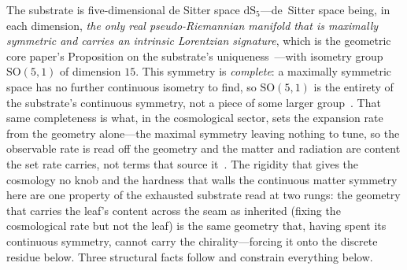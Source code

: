 \documentclass[11pt]{article}
\theoremstyle{plain}
\theoremstyle{remark}
\newcommand{\dS}{\mathrm{dS}}
\newcommand{\SO}{\mathrm{SO}}
\begin{document}
The substrate is five-dimensional de Sitter space $\dS_5$---de~Sitter space being, in each dimension, \emph{the only real pseudo-Riemannian manifold that is maximally symmetric and carries an intrinsic Lorentzian signature}, which is the geometric core paper's Proposition on the substrate's uniqueness~\cite{JanzenGeometricCore,JanzenThesis}---with isometry group $\SO(5,1)$ of dimension $15$. This symmetry is \emph{complete}: a maximally symmetric space has no further continuous isometry to find, so $\SO(5,1)$ is the entirety of the substrate's continuous symmetry, not a piece of some larger group~\cite{JanzenRange}. That same completeness is what, in the cosmological sector, sets the expansion rate from the geometry alone---the maximal symmetry leaving nothing to tune, so the observable rate is read off the geometry and the matter and radiation are content the set rate carries, not terms that source it~\cite{JanzenCRframework,JanzenCosmogenesis}. The rigidity that gives the cosmology no knob and the hardness that walls the continuous matter symmetry here are one property of the exhausted substrate read at two rungs: the geometry that carries the leaf's content across the seam as inherited (fixing the cosmological rate but not the leaf) is the same geometry that, having spent its continuous symmetry, cannot carry the chirality---forcing it onto the discrete residue below. Three structural facts follow and constrain everything below.
\end{document}

